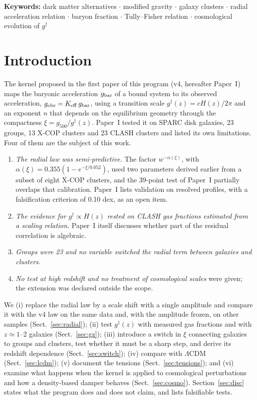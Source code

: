 \documentclass[11pt,a4paper]{article}
\newcommand{\gdag}{g^{\dagger}}
\newcommand{\Keff}{K_{\rm eff}}
\begin{document}
\noindent\textbf{Keywords:} dark matter alternatives $\cdot$ modified gravity $\cdot$ galaxy clusters $\cdot$ radial acceleration relation $\cdot$ baryon fraction $\cdot$ Tully--Fisher relation $\cdot$ cosmological evolution of $\gdag$

\tableofcontents
\newpage

\section{Introduction}
The kernel proposed in the first paper of this program (v4, hereafter Paper~I) maps the baryonic acceleration $g_{\rm bar}$ of a bound system to its observed acceleration, $g_{\rm obs}=\Keff\,g_{\rm bar}$, using a transition scale $\gdag(z)=cH(z)/2\pi$ and an exponent $n$ that depends on the equilibrium geometry through the compactness $\xi=g_{500}/\gdag(z)$. Paper~I tested it on SPARC disk galaxies, 23 groups, 13 X-COP clusters and 23 CLASH clusters and listed its own limitations. Four of them are the subject of this work.

\begin{enumerate}[leftmargin=2em,itemsep=0.1em]
\item \emph{The radial law was semi-predictive.} The factor $w^{-\alpha(\xi)}$, with $\alpha(\xi)=0.355(1-e^{-\xi/0.052})$, used two parameters derived earlier from a subset of eight X-COP clusters, and the 39-point test of Paper~I partially overlaps that calibration. Paper~I lists validation on resolved profiles, with a falsification criterion of 0.10 dex, as an open item.
\item \emph{The evidence for $\gdag\propto H(z)$ rested on CLASH gas fractions estimated from a scaling relation.} Paper~I itself discusses whether part of the residual correlation is algebraic.
\item \emph{Groups were 23 and no variable switched the radial term between galaxies and clusters.}
\item \emph{No test at high redshift and no treatment of cosmological scales} were given; the extension was declared outside the scope.
\end{enumerate}

We (i) replace the radial law by a scale shift with a single amplitude and compare it with the v4 law on the same data and, with the amplitude frozen, on other samples (Sect.~\ref{sec:radial}); (ii) test $\gdag(z)$ with measured gas fractions and with $z\simeq1$--2 galaxies (Sect.~\ref{sec:gz}); (iii) introduce a switch in $\xi$ connecting galaxies to groups and clusters, test whether it must be a sharp step, and derive its redshift dependence (Sect.~\ref{sec:switch}); (iv) compare with $\Lambda$CDM (Sect.~\ref{sec:lcdm}); (v) document the tensions (Sect.~\ref{sec:tensions}); and (vi) examine what happens when the kernel is applied to cosmological perturbations and how a density-based damper behaves (Sect.~\ref{sec:cosmo}). Section~\ref{sec:disc} states what the program does and does not claim, and lists falsifiable tests.
\end{document}
